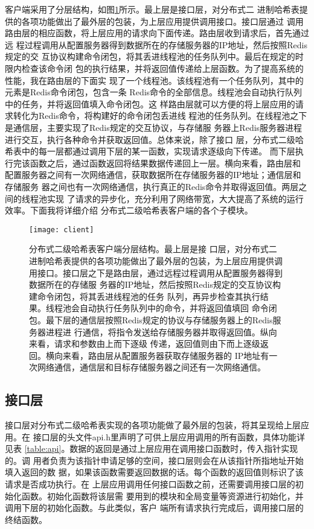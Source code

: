 客户端采用了分层结构，如图\ref{figure:client}所示。最上层是接口层，对分布式二
进制哈希表提供的各项功能做出了最外层的包装，为上层应用提供调用接口。接口层通过
调用路由层的相应函数，将上层应用的请求向下面传递。路由层收到请求后，首先通过远
程过程调用从配置服务器得到数据所在的存储服务器的IP地址，然后按照Redis规定的交
互协议构建命令闭包，将其丢进线程池的任务队列中。最后在规定的时限内检查该命令闭
包的执行结果，并将返回值传递给上层函数。为了提高系统的性能，我在路由层的下面实
现了一个线程池。该线程池有一个任务队列，其中的元素是Redis命令闭包，包含一条
Redis命令的全部信息。线程池会自动执行队列中的任务，并将返回值填入命令闭包。这
样路由层就可以方便的将上层应用的请求转化为Redis命令，将构建好的命令闭包丢进线
程池的任务队列。在线程池之下是通信层，主要实现了Redis规定的交互协议，与存储服
务器上Redis服务器进程进行交互，执行各种命令并获取返回值。总体来说，除了接口
层，分布式二级哈希表中的每一层都通过调用下层的某一函数，实现请求逐级向下传递。
而下层执行完该函数之后，通过函数返回将结果数据传递回上一层。横向来看，路由层和
配置服务器之间有一次网络通信，获取数据所在存储服务器的IP地址；通信层和存储服务
器之间也有一次网络通信，执行真正的Redis命令并取得返回值。两层之间的线程池实现
了请求的异步化，充分利用了网络带宽，大大提高了系统的运行效率。下面我将详细介绍
分布式二级哈希表客户端的各个子模块。
\begin{figure}[htb]
  \centering
  \texttt{[image: client]}
  \caption[分布式二级哈希表客户端]{分布式二级哈希表客户端分层结构。最上层是接
  口层，对分布式二进制哈希表提供的各项功能做出了最外层的包装，为上层应用提供调
  用接口。接口层之下是路由层，通过远程过程调用从配置服务器得到数据所在的存储服
  务器的IP地址，然后按照Redis规定的交互协议构建命令闭包，将其丢进线程池的任务
  队列，再异步检查其执行结果。线程池会自动执行任务队列中的命令，并将返回值填回
  命令闭包。最下层的通信层按照Redis规定的协议与存储服务器上的Redis服务器进程进
  行通信，将指令发送给存储服务器并取得返回值。纵向来看，请求和参数由上而下逐级
  传递，返回值则由下而上逐级返回。横向来看，路由层从配置服务器获取存储服务器的
  IP地址有一次网络通信，通信层和目标存储服务器之间还有一次网络通信。}
  \label{figure:client}
\end{figure}

\subsection{接口层}
接口层对分布式二级哈希表实现的各项功能做了最外层的包装，将其呈现给上层应用。在
接口层的头文件api.h里声明了可供上层应用调用的所有函数，具体功能详见表
\ref{table:api}。数据的返回是通过上层应用在调用接口函数时，传入指针实现的。调
用者负责为该指针申请足够的空间，接口层则会在从该指针所指地址开始填入返回的数
据，如果该函数需要返回数据的话。每个函数的返回值则标识了该请求是否成功执行。在
上层应用调用任何接口函数之前，还需要调用接口层的初始化函数。初始化函数将该层需
要用到的模块和全局变量等资源进行初始化，并调用下层的初始化函数。与此类似，客户
端所有请求执行完成后，调用接口层的终结函数。

